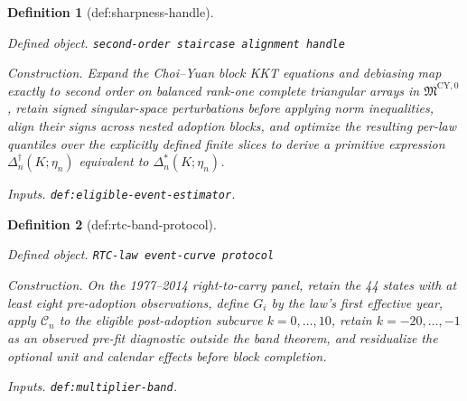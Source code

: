 \documentclass{article}
\newtheorem{definition}{Definition}
\begin{document}
\begin{definition}[def:sharpness-handle]\label{def:sharpness-handle}
\par\smallskip\noindent\emph{Defined object.} \texttt{second-\allowbreak{}order staircase alignment handle}
\par\smallskip\noindent\emph{Construction.} Expand the Choi--Yuan block KKT equations and debiasing map exactly to second order on balanced rank-one complete triangular arrays in \(\mathfrak M^{\mathrm{CY},0}\), retain signed singular-space perturbations before applying norm inequalities, align their signs across nested adoption blocks, and optimize the resulting per-law quantiles over the explicitly defined finite slices to derive a primitive expression \(\Delta_n^{\dagger}(K;\eta_n)\) equivalent to \(\Delta_n^*(K;\eta_n)\).
\par\smallskip\noindent\emph{Inputs.} \texttt{def:\allowbreak{}eligible-\allowbreak{}event-\allowbreak{}estimator}.
\end{definition}

\begin{definition}[def:rtc-band-protocol]\label{def:rtc-band-protocol}
\par\smallskip\noindent\emph{Defined object.} \texttt{RTC-\allowbreak{}law event-\allowbreak{}curve protocol}
\par\smallskip\noindent\emph{Construction.} On the 1977--2014 right-to-carry panel, retain the 44 states with at least eight pre-adoption observations, define \(G_i\) by the law's first effective year, apply \(\mathcal C_n\) to the eligible post-adoption subcurve \(k=0,\ldots,10\), retain \(k=-20,\ldots,-1\) as an observed pre-fit diagnostic outside the band theorem, and residualize the optional unit and calendar effects before block completion.
\par\smallskip\noindent\emph{Inputs.} \texttt{def:\allowbreak{}multiplier-\allowbreak{}band}.
\end{definition}
\end{document}
